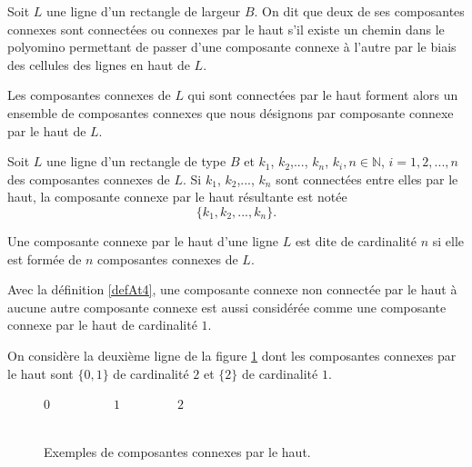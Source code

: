\begin{Def}\label{defAt2}
Soit $L$ une ligne d'un rectangle de largeur $B$. On dit que deux de ses composantes connexes sont connectées ou connexes par le haut s'il existe  un chemin dans le polyomino permettant de passer d'une composante connexe à l'autre par le biais des cellules des lignes en haut de $L$.

Les composantes connexes  de $L$  qui sont connectées par le haut forment alors un ensemble de composantes connexes que nous désignons par composante connexe par le haut de $L$. 
\end{Def}
\begin{Not}\label{notal1}
Soit $L$ une ligne d'un rectangle de type $B$ et $k_{1}$, $k_{2}$,..., $k_{n}$, $k_{i}, n\in\mathbb{N}$, $i=1,2,...,n$ des composantes connexes de $L$. Si $k_{1}$, $k_{2}$,..., $k_{n}$ sont connectées entre elles par le haut, la composante connexe par le haut résultante est notée 
$$\{k_{1}, k_{2},...,k_{n}\}.$$
\end{Not}
\begin{Def}\label{defAt4}
Une composante connexe par le haut d'une ligne $L$  est dite de cardinalité $n$ si elle est formée de $n$ composantes connexes de $L$.
\end{Def}
\begin{Rem}\label{remexc}
 Avec la définition \ref{defAt4}, une composante connexe non connectée par le haut à aucune autre composante connexe est aussi considérée comme une composante connexe par le haut de cardinalité $1$.
\end{Rem}
\begin{Ex}\label{ex2}
On considère la deuxième ligne de la figure \ref{AtfigN} dont les composantes connexes par le haut  sont $\{0,1\}$ de  cardinalité $2$ et
$\{2\}$  de cardinalité $1$.
\end{Ex}
\begin{figure}[!htb]
\begin{minipage}[c]{.16\linewidth}
        \centering
\end{minipage}
\hfill
\begin{minipage}[c]{.66\linewidth}
        \centering
\begin{logicpuzzle}[rows=2,columns=8,color=cyan!100, width=750px,scale=0.5]
\framepuzzle[black!50]
\end{logicpuzzle}
$0$\mbox{    }\mbox{    }\mbox{    }\mbox{    }\mbox{    }\mbox{    }\mbox{    }\mbox{    }\mbox{    }\mbox{    }$1$\mbox{    }\mbox{    }\mbox{    }\mbox{    }\mbox{    }\mbox{    }\mbox{    }\mbox{    }\mbox{    }$2$\mbox{    }\mbox{    }\mbox{    }\mbox{    }\mbox{    }\mbox{    }\mbox{    }\mbox{    }\mbox{    }\mbox{    }\mbox{    }\mbox{    }\mbox{    }\mbox{    }\mbox{    }\mbox{    }\mbox{    }\mbox{    }\mbox{    }\mbox{    }\mbox{    }\mbox{    }\mbox{    }\mbox{    }\mbox{    }\mbox{    }\mbox{    }\mbox{    }\mbox{    }\mbox{    }\mbox{    }\mbox{    }\mbox{    }\mbox{    }\mbox{    }\mbox{    }\mbox{    }\mbox{    }\mbox{    }\mbox{    }
\end{minipage}
\caption{\label{AtfigN} Exemples de composantes connexes par le haut.}
\end{figure} 
